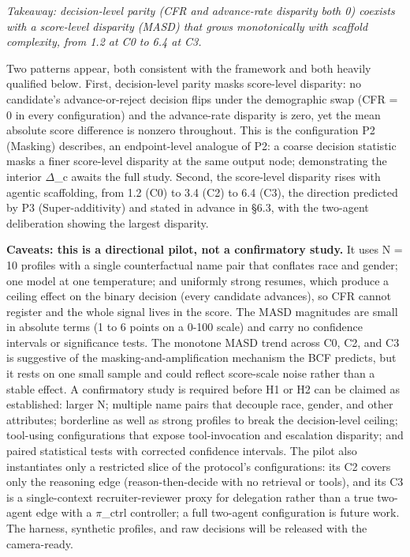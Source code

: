 \documentclass[10pt]{article}
\begin{document}
\emph{Takeaway: decision-level parity (CFR and advance-rate disparity both 0) coexists with a score-level disparity (MASD) that grows monotonically with scaffold complexity, from 1.2 at C0 to 6.4 at C3.}

Two patterns appear, both consistent with the framework and both heavily qualified below. First, decision-level parity masks score-level disparity: no candidate's advance-or-reject decision flips under the demographic swap (CFR = 0 in every configuration) and the advance-rate disparity is zero, yet the mean absolute score difference is nonzero throughout. This is the configuration P2 (Masking) describes, an endpoint-level analogue of P2: a coarse decision statistic masks a finer score-level disparity at the same output node; demonstrating the interior $\Delta$\_c awaits the full study. Second, the score-level disparity rises with agentic scaffolding, from 1.2 (C0) to 3.4 (C2) to 6.4 (C3), the direction predicted by P3 (Super-additivity) and stated in advance in \S{}6.3, with the two-agent deliberation showing the largest disparity.

\textbf{Caveats: this is a directional pilot, not a confirmatory study.} It uses N = 10 profiles with a single counterfactual name pair that conflates race and gender; one model at one temperature; and uniformly strong resumes, which produce a ceiling effect on the binary decision (every candidate advances), so CFR cannot register and the whole signal lives in the score. The MASD magnitudes are small in absolute terms (1 to 6 points on a 0-100 scale) and carry no confidence intervals or significance tests. The monotone MASD trend across C0, C2, and C3 is suggestive of the masking-and-amplification mechanism the BCF predicts, but it rests on one small sample and could reflect score-scale noise rather than a stable effect. A confirmatory study is required before H1 or H2 can be claimed as established: larger N; multiple name pairs that decouple race, gender, and other attributes; borderline as well as strong profiles to break the decision-level ceiling; tool-using configurations that expose tool-invocation and escalation disparity; and paired statistical tests with corrected confidence intervals. The pilot also instantiates only a restricted slice of the protocol's configurations: its C2 covers only the reasoning edge (reason-then-decide with no retrieval or tools), and its C3 is a single-context recruiter-reviewer proxy for delegation rather than a true two-agent edge with a $\pi$\_ctrl controller; a full two-agent configuration is future work. The harness, synthetic profiles, and raw decisions will be released with the camera-ready.
\end{document}
